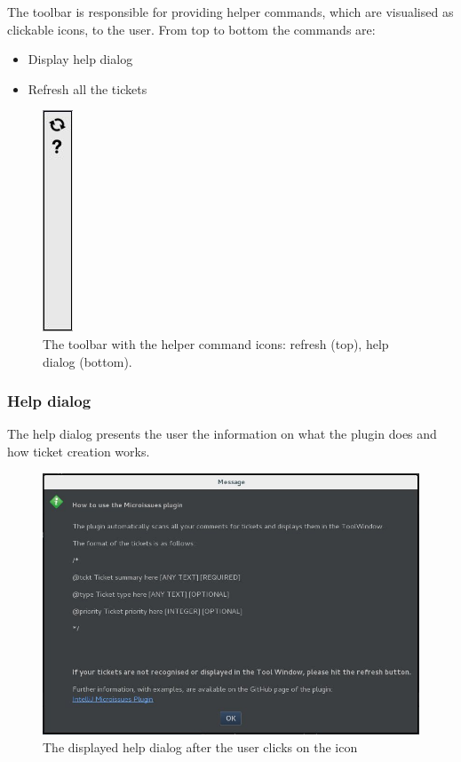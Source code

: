 \documentclass{4thYearProject}
\begin{document}
The toolbar is responsible for providing helper commands, which are visualised as clickable icons, to the user. \newline
From top to bottom the commands are:
\begin{itemize}
\item Display help dialog
\item Refresh all the tickets
\end{itemize}

\begin{figure}[H]
\includegraphics[scale=0.6]{Toolbar_figure_white}
\centering
\caption{The toolbar with the helper command icons: refresh (top), help dialog (bottom).}\label{toolbar}
\label{fig:toolbar}
\end{figure}

\subsubsection{Help dialog}

The help dialog presents the user the information on what the plugin does and how ticket creation works. 

\begin{figure}[H]
\includegraphics[scale=0.6]{HelpDialog}
\centering
\caption{The displayed help dialog after the user clicks on the icon}\label{helpdialog}
\label{fig:helpdialog}
\end{figure}
\end{document}
